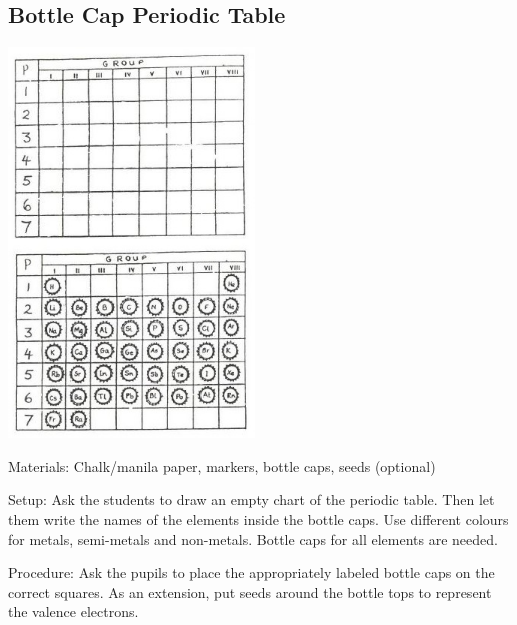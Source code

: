 \begin{multicols}{2}
\subsection{Bottle Cap Periodic Table}

\begin{center}
\includegraphics[width=0.49\textwidth]{./img/source/periodic-table.jpg}
\end{center}

\begin{description*}
\item[Materials:]{Chalk/manila paper, markers, bottle caps, seeds (optional)}
\item[Setup:]{Ask the students to draw an empty chart
of the periodic table. Then let them write the names of the
elements inside the bottle caps.
Use different colours for metals, semi-metals
and non-metals. Bottle caps for all elements are
needed.}
\item[Procedure:]{Ask the pupils
to place the appropriately labeled bottle caps on
the correct squares. As an extension, put seeds around
the bottle tops to represent the valence electrons.}
\end{description*}


\end{multicols}
